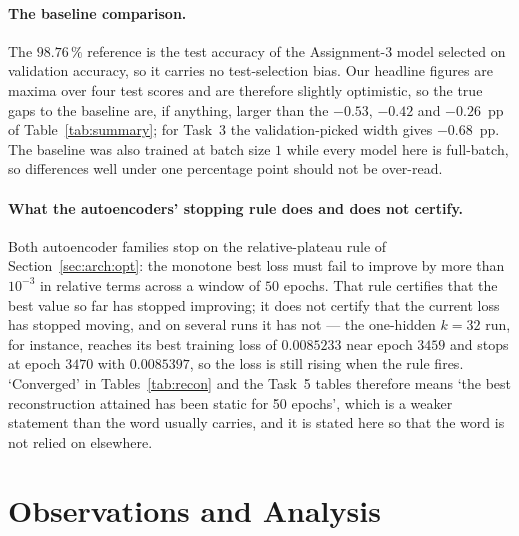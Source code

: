 \documentclass[11pt,a4paper]{article}
\begin{document}
\paragraph{The baseline comparison.}
The $98.76\,\%$ reference is the test accuracy of the Assignment-3 model selected on validation
accuracy, so it carries no test-selection bias.  Our headline figures are maxima over four test
scores and are therefore slightly optimistic, so the true gaps to the baseline are, if anything,
larger than the $-0.53$, $-0.42$ and $-0.26$~pp of Table~\ref{tab:summary}; for Task~3 the
validation-picked width gives $-0.68$~pp.  The baseline was also trained at batch size $1$ while
every model here is full-batch, so differences well under one percentage point should not be
over-read.

\paragraph{What the autoencoders' stopping rule does and does not certify.}
Both autoencoder families stop on the relative-plateau rule of Section~\ref{sec:arch:opt}: the
monotone best loss must fail to improve by more than $10^{-3}$ in relative terms across a window
of $50$ epochs.  That rule certifies that the best value so far has stopped improving; it does not
certify that the current loss has stopped moving, and on several runs it has not --- the
one-hidden $k=32$ run, for instance, reaches its best training loss of $0.0085233$ near epoch
$3459$ and stops at epoch $3470$ with $0.0085397$, so the loss is still rising when the rule fires.
`Converged' in Tables~\ref{tab:recon} and the Task~5 tables therefore means `the best reconstruction
attained has been static for 50 epochs', which is a weaker statement than the word usually carries,
and it is stated here so that the word is not relied on elsewhere.

\section{Observations and Analysis}\label{sec:obs}
\end{document}
